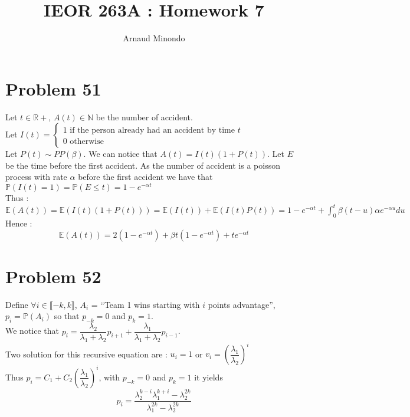 \documentclass{article}
\title{IEOR 263A : Homework 7}
\author{Arnaud Minondo}
\begin{document}
\maketitle
\section*{Problem 51}
Let $t\in\mathbb{R}+$, $A(t)\in\mathbb{N}$ be the number of accident. \\
Let $I(t) = \left\{\begin{array}{l}
    1 \text{ if the person already had an accident by time } t\\
    0 \text{ otherwise}
\end{array}\right.$\\
Let $P(t)\sim PP(\beta)$. We can notice that $A(t) = I(t)(1+P(t))$. Let $E$ be the time before the first accident.
As the number of accident is a poisson process with rate $\alpha$ before the first accident we have that $\mathbb{P}(I(t) = 1) = \mathbb{P}(E\leq t) = 1 - e^{-\alpha t}$
\\
Thus : $\mathbb{E}(A(t)) 
= \mathbb{E}(I(t)(1+P(t)))
= \mathbb{E}(I(t))+\mathbb{E}(I(t)P(t)) 
= 1 - e^{-\alpha t} + \int_0^t \beta (t-u) \alpha e ^{-\alpha u} du $\\
Hence : \begin{equation*}
    \boxed{\mathbb{E}(A(t))= 2(1-e^{-\alpha t}) + \beta t (1-e^{-\alpha t}) + t e^{-\alpha t}}
\end{equation*}
\section*{Problem 52}
Define $\forall i \in \llbracket -k, k\rrbracket$, $A_i$ = ``Team 1 wins starting with $i$ points advantage'', $p_i = \mathbb{P}(A_i)$ so that $p_{-k} = 0$ and $p_k = 1$.
\\
We notice that $p_i = \dfrac{\lambda_2}{\lambda_1+\lambda_2}p_{i+1} + \dfrac{\lambda_1}{\lambda_1+\lambda_2}p_{i-1}$.
\\
Two solution for this recursive equation are : $u_i = 1$ or $v_i =\left(\dfrac{\lambda_1}{\lambda_2}\right)^i$
\\
Thus $p_i = C_1+C_2\left(\dfrac{\lambda_1}{\lambda_2}\right)^i$, with $p_{-k} = 0$ and $p_k = 1$ it yields $$\boxed{p_i = \dfrac{\lambda_2^{k-i}\lambda_1^{k+i}-\lambda_2^{2k}}{\lambda_1^{2k}-\lambda_2^{2k}}}$$
\end{document}
